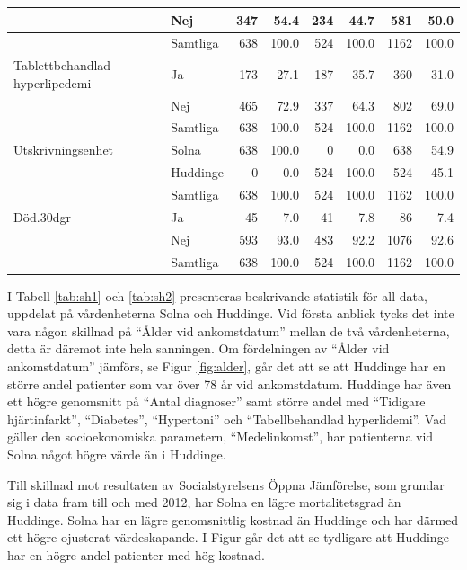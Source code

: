\begin{table}[htbp]
{\begin{tabular}{ll|rr|rr|rr}
   & Nej & 347 & 54.4 & 234 & 44.7 & 581 & 50.0 \\ 
   \hline
 & Samtliga & 638 & 100.0 & 524 & 100.0 & 1162 & 100.0 \\ 
   \hline
\hline
Tablettbehandlad hyperlipedemi & Ja & 173 & 27.1 & 187 & 35.7 & 360 & 31.0 \\ 
   & Nej & 465 & 72.9 & 337 & 64.3 & 802 & 69.0 \\ 
   \hline
 & Samtliga & 638 & 100.0 & 524 & 100.0 & 1162 & 100.0 \\ 
   \hline
\hline
Utskrivningsenhet & Solna & 638 & 100.0 & 0 & 0.0 & 638 & 54.9 \\ 
   & Huddinge & 0 & 0.0 & 524 & 100.0 & 524 & 45.1 \\ 
   \hline
 & Samtliga & 638 & 100.0 & 524 & 100.0 & 1162 & 100.0 \\ 
   \hline
\hline
Död.30dgr & Ja & 45 & 7.0 & 41 & 7.8 & 86 & 7.4 \\ 
   & Nej & 593 & 93.0 & 483 & 92.2 & 1076 & 92.6 \\ 
   \hline
 & Samtliga & 638 & 100.0 & 524 & 100.0 & 1162 & 100.0 \\ 
   \hline
\hline
\end{tabular}
}

\end{table}


I Tabell \ref{tab:sh1} och \ref{tab:sh2} presenteras beskrivande statistik för all data, uppdelat på vårdenheterna Solna och Huddinge. Vid första anblick tycks det inte vara någon skillnad på “Ålder vid ankomstdatum” mellan de två vårdenheterna, detta är däremot inte hela sanningen. Om fördelningen av “Ålder vid ankomstdatum” jämförs, se Figur \ref{fig:alder}, går det att se att Huddinge har en större andel patienter som var över 78 år vid ankomstdatum. Huddinge har även ett högre genomsnitt på “Antal diagnoser” samt större andel med “Tidigare hjärtinfarkt”, “Diabetes”, “Hypertoni” och “Tabellbehandlad hyperlidemi”. Vad gäller den socioekonomiska parametern, ``Medelinkomst'', har patienterna vid Solna något högre värde än i Huddinge.

Till skillnad mot resultaten av Socialstyrelsens Öppna Jämförelse, som grundar sig i data fram till och med 2012, har Solna en lägre mortalitetsgrad än Huddinge. Solna har en lägre genomsnittlig kostnad än Huddinge och har därmed ett högre ojusterat värdeskapande. I Figur \label{fig:kostnad} går det att se tydligare att Huddinge har en högre andel patienter med hög kostnad.

